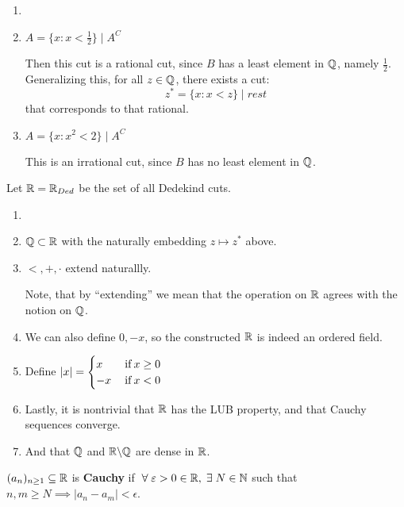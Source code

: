 \begin{example}
\begin{enumerate}
    \item []
    \item  $A = \{x : x < \frac{1}{2} \} \mid A^C$
    
    Then this cut is a rational cut, since $B$ has a least element in $\mathbb{Q}$, namely $\frac{1}{2}$. Generalizing this, for all $z \in \mathbb{Q}$, there exists a cut: \[
    z^* = \{x: x < z\} \mid rest
    \]
    that corresponds to that rational.
    \item $A = \{x: x^2 < 2\} \mid A^C $
    
    This is an irrational cut, since $B$ has no least element in $\mathbb{Q}$.
\end{enumerate}
\end{example}

\begin{definition} 
Let $\mathbb{R} = \mathbb{R}_{Ded}$ be the set of all Dedekind cuts.
\end{definition}
\begin{properties}
\begin{enumerate}
    \item []
    \item $\mathbb{Q} \subset \mathbb{R}$ with the naturally embedding $z \mapsto z^*$ above.
    \item $<, +, \cdot$ extend naturallly.
    
    Note, that by ``extending'' we mean that the operation on $\mathbb{R}$ agrees with the notion on $\mathbb{Q}$.
    \item We can also define $0, -x$, so the constructed $\mathbb{R}$ is indeed an ordered field.
    \item Define $\lvert x\rvert = \begin{cases}
    x & \:\text{if}\: x \geq 0 \\
    -x & \:\text{if}\: x < 0
    \end{cases}$
    \item Lastly, it is nontrivial that $\mathbb{R}$ has the LUB property, and that Cauchy sequences converge.
    \item And that $\mathbb{Q}$ and $\mathbb{R} \backslash \mathbb{Q}$ are dense in $\mathbb{R}$.
\end{enumerate}
\end{properties}
\begin{definition} 
$(a_n)_{n \geq 1} \subseteq \mathbb{R}$ is \textbf{Cauchy} if $\forall \epsilon > 0 \in \bbr, \exists N \in \bbn $ such that $n, m \geq N \implies |a_n - a_m| < \epsilon$.
\end{definition}

